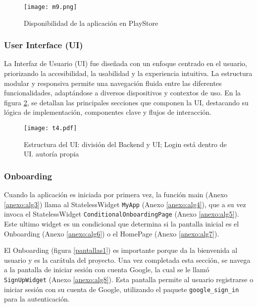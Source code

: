 \begin{figure}[h!]
\centering
  \texttt{[image: m9.png]}
  \caption{Disponibilidad de la aplicación en PlayStore}
  \label{m9}
\end{figure}










\newpage
\subsubsection{User Interface (UI)}
La Interfaz de Usuario (UI) fue diseñada con un enfoque centrado en el usuario, priorizando la accesibilidad, la usabilidad y la experiencia intuitiva. La estructura modular y responsiva permite una navegación fluida entre las diferentes funcionalidades, adaptándose a diversos dispositivos y contextos de uso. En la figura \ref{m10}, se detallan las principales secciones que componen la UI, destacando su lógica de implementación, componentes clave y flujos de interacción.

\begin{figure}[h!]
\centering
  \texttt{[image: t4.pdf]}
  \caption{Estructura del UI: división del Backend y UI; Login está dentro de UI. autoría propia}
  \label{m10}
\end{figure}

\subsubsection*{Onboarding}

Cuando la aplicación es iniciada por primera vez, la función main (Anexo \ref{anexo:alg3}) llama al StatelessWidget \texttt{MyApp} (Anexo \ref{anexo:alg4}), que a su vez invoca el StatelessWidget \texttt{ConditionalOnboardingPage} (Anexo \ref{anexo:alg5}). Este ultimo widget es un condicional que determina si la pantalla inicial es el Onboarding (Anexo \ref{anexo:alg6}) o el HomePage (Anexo \ref{anexo:alg7}).

El Onboarding (figura \ref{pantallas1}) es importante porque da la bienvenida al usuario y es la carátula del proyecto. Una vez completada esta sección, se navega a la pantalla de iniciar sesión con cuenta Google, la cual se le llamó \texttt{SignUpWidget} (Anexo \ref{anexo:alg8}). Esta pantalla permite al usuario registrarse o iniciar sesión con su cuenta de Google, utilizando el paquete \texttt{google\_sign\_in} para la autenticación.

